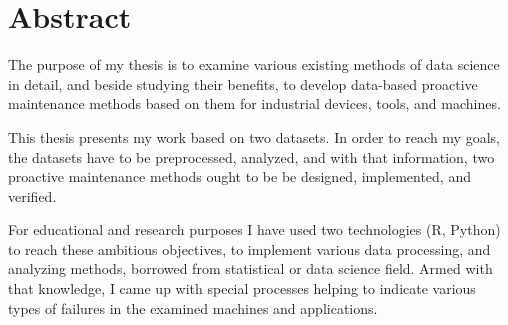\chapter*{Abstract}

The purpose of my thesis is to examine various existing methods of data science in detail, and beside studying their benefits, to develop data-based proactive maintenance methods based on them for industrial devices, tools, and machines.

This thesis presents my work based on two datasets. In order to reach my goals, the datasets have to be preprocessed, analyzed, and with that information, two proactive maintenance methods ought to be be designed, implemented, and verified.

For educational and research purposes I have used two technologies (R, Python) to reach these ambitious objectives, to implement various data processing, and analyzing methods, borrowed from statistical or data science field. Armed with that knowledge, I came up with special processes helping to indicate various types of failures in the examined machines and applications.